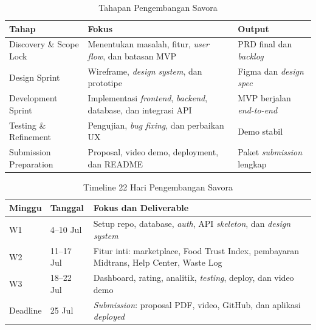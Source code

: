 \begin{table}[htbp]
\centering
\caption{Tahapan Pengembangan Savora}
\label{tab:tahapan}
\begin{tabularx}{\textwidth}{|l|X|X|}
\hline
\textbf{Tahap} & \textbf{Fokus} & \textbf{Output} \\
\hline
Discovery \& Scope Lock & Menentukan masalah, fitur, \textit{user flow}, dan batasan MVP & PRD final dan \textit{backlog} \\
\hline
Design Sprint & Wireframe, \textit{design system}, dan prototipe & Figma dan \textit{design spec} \\
\hline
Development Sprint & Implementasi \textit{frontend}, \textit{backend}, database, dan integrasi API & MVP berjalan \textit{end-to-end} \\
\hline
Testing \& Refinement & Pengujian, \textit{bug fixing}, dan perbaikan UX & Demo stabil \\
\hline
Submission Preparation & Proposal, video demo, deployment, dan README & Paket \textit{submission} lengkap \\
\hline
\end{tabularx}
\end{table}

\begin{table}[htbp]
\centering
\caption{Timeline 22 Hari Pengembangan Savora}
\label{tab:timeline}
\begin{tabularx}{\textwidth}{|l|l|X|}
\hline
\textbf{Minggu} & \textbf{Tanggal} & \textbf{Fokus dan Deliverable} \\
\hline
W1 & 4--10 Jul & Setup repo, database, \textit{auth}, API \textit{skeleton}, dan \textit{design system} \\
\hline
W2 & 11--17 Jul & Fitur inti: marketplace, Food Trust Index, pembayaran Midtrans, Help Center, Waste Log \\
\hline
W3 & 18--22 Jul & Dashboard, rating, analitik, \textit{testing}, deploy, dan video demo \\
\hline
Deadline & 25 Jul & \textit{Submission}: proposal PDF, video, GitHub, dan aplikasi \textit{deployed} \\
\hline
\end{tabularx}
\end{table}


